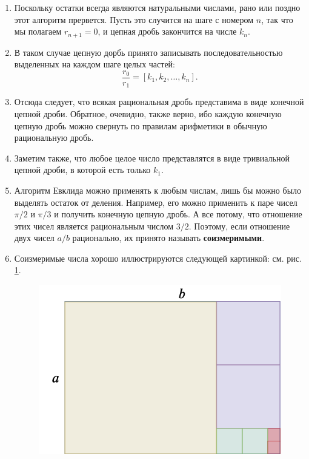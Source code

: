 \begin{enumerate}
\item Поскольку остатки всегда являются натуральными числами, рано или поздно этот алгоритм прервется. Пусть это случится на шаге с номером $n$, так что мы полагаем $r_{n+1}=0$, и цепная дробь закончится на числе $k_n$.
\item В таком случае цепную дорбь принято записывать последовательностью выделенных на каждом шаге целых частей:
$$
\frac{r_0}{r_1} = [k_1,k_2,\dots,k_n].
$$
\item Отсюда следует, что всякая рациональная дробь представима в виде конечной цепной дроби. Обратное, очевидно, также верно, ибо каждую конечную цепную дробь можно свернуть по правилам арифметики в обычную рациональную дробь.
\item Заметим также, что любое целое число представлятся в виде тривиальной цепной дроби, в которой есть только $k_1$.
\item Алгоритм Евклида можно применять к любым числам, лишь бы можно было выделять остаток от деления. Например, его можно применить к паре чисел $\pi/2$ и $\pi/3$ и получить конечную цепную дробь. А все потому, что отношение этих чисел является рациональным числом $3/2$. Поэтому, если отношение двух чисел $a/b$ рационально, их принято называть \textbf{соизмеримыми}.
\item\label{soizm} Соизмеримые числа хорошо иллюстрируются следующей картинкой: см. рис. \ref{soizmer2}.
\begin{figure}[hbt!]
\begin{center}
\includegraphics[scale=0.3]{soizmer.png}
\end{center}
\caption{}\label{soizmer2}
\end{figure}

\end{enumerate}
